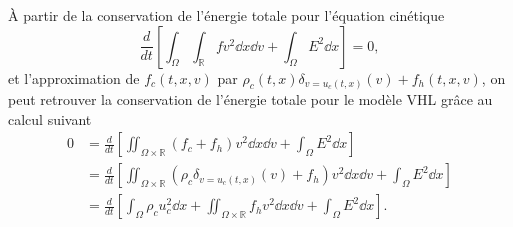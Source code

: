 \begin{remark}
  À partir de la conservation de l'énergie totale pour l'équation cinétique 
  $$
    \frac{d}{dt} \left[ \int_\Omega \int_{\mathbb{R}} f v^2 \dd{x}\dd{v} + \int_\Omega E^2 \dd{x}\right] = 0, 
  $$
  et l'approximation de $f_c(t, x, v)$ par $\rho_c(t, x) \delta_{v=u_c(t, x)}(v) + f_h(t, x, v)$, on peut retrouver la conservation de l'énergie totale pour le modèle VHL grâce au calcul suivant 
  $$
    \begin{aligned}
      0 &= \frac{d}{dt} \left[ \iint_{\Omega\times\mathbb{R}} (f_c + f_h) v^2 \dd{x}\dd{v} + \int_\Omega E^2 \dd{x}\right] \\
        &= \frac{d}{dt} \left[\iint_{\Omega\times\mathbb{R}} (\rho_c \delta_{v=u_c(t, x)}(v)  + f_h) v^2 \dd{x}\dd{v} + \int_\Omega E^2 \dd{x}\right] \\
        &= \frac{d}{dt} \left[ \int_\Omega \rho_c u_c^2 \dd{x}+ \iint_{\Omega\times\mathbb{R}} f_h v^2 \dd{x}\dd{v} + \int_\Omega E^2 \dd{x}\right]. 
    \end{aligned}
  $$
\end{remark}

